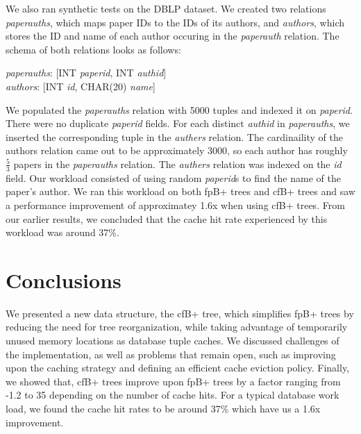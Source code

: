 \documentclass{article}
\begin{document}
We also ran synthetic tests on the DBLP dataset. We created two relations \textit{paperauths}, which maps paper IDs to the IDs of its authors, and \textit{authors}, which stores the ID and name of each author occuring in the \textit{paperauth} relation. The schema of both relations looks as follows:

\textit{paperauths}: [INT \textit{paperid}, INT \textit{authid}] \\
\textit{authors}: [INT \textit{id}, CHAR(20) \textit{name}]

We populated the \textit{paperauths} relation with 5000 tuples and indexed it on \textit{paperid}. There were no duplicate \textit{paperid} fields. For each distinct \textit{authid} in \textit{paperauths}, we inserted the corresponding tuple in the \textit{authers} relation. The cardinaility of the authors relation came out to be approximately 3000, so each author has roughly $\frac{5}{3}$ papers in the \textit{paperauths} relation. The \textit{authers} relation was indexed on the \textit{id} field. Our workload consisted of using random \textit{paperid}s to find the name of the paper's author. We ran this workload on both fpB+ trees and cfB+ trees and saw a performance improvement of approximatey 1.6x when using cfB+ trees. From our earlier results, we concluded that the cache hit rate experienced by this workload was around 37\%.

\section{Conclusions}
We presented a new data structure, the cfB+ tree, which simplifies fpB+ trees by
reducing the need for tree reorganization,
while taking advantage of temporarily unused memory locations as database tuple
caches.
We discussed challenges of the implementation, as well as problems that remain
open,
such as improving upon the caching strategy and defining an efficient cache
eviction policy.
Finally, we showed that, cfB+ trees improve upon fpB+ trees by a factor ranging
from -1.2 to 35 depending on the number of cache hits. For a typical database
work load, we found the cache hit rates to be around 37\% which have us a 1.6x
improvement.

\small



\end{document}
